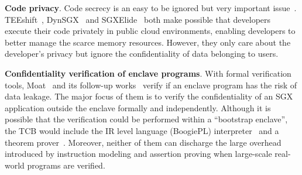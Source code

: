 \vspace{3pt}\noindent\textbf{Code privacy}.
Code secrecy is an easy to be ignored but very important issue~\cite{kuccuk2019managing}. TEEshift~\cite{lazard2018teeshift}, 
DynSGX~\cite{silva2017dynsgx} and SGXElide~\cite{bauman2018sgxelide} both make possible that developers execute their code privately in public cloud environments, enabling developers to better manage the scarce memory resources. However, they only care about the developer's privacy but ignore the confidentiality of data belonging to users. %

\vspace{3pt}\noindent\textbf{Confidentiality verification of enclave programs}.
With formal verification tools, Moat~\cite{sinha2015moat} and its follow-up works~\cite{sinha2016design} verify if an enclave program has the risk of data leakage. The major focus of them is to verify the confidentiality of an SGX application outside the enclave formally and independently. Although it is possible that the verification could be performed within a ``bootstrap enclave'', the TCB would include the IR level language (BoogiePL) interpreter~\cite{barnett2005boogie} and a theorem prover~\cite{de2008z3}. Moreover, neither of them can discharge the large overhead introduced by instruction modeling and assertion proving when large-scale real-world programs are verified.






